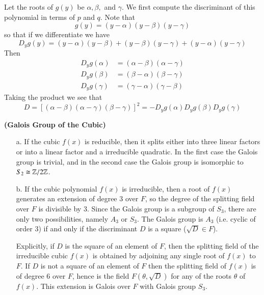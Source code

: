 Let the roots of $g(y)$ be $\alpha, \beta,$ and $\gamma$. We first compute the discriminant of this polynomial in terms of $p$ and $q$. Note that \begin{equation*}
    g(y) = (y-\alpha)(y-\beta)(y-\gamma)
\end{equation*}
so that if we differentiate we have \begin{equation*}
    D_yg(y) = (y-\alpha)(y-\beta) + (y-\beta)(y-\gamma) + (y-\alpha)(y-\gamma)
\end{equation*}
Then \begin{align*}
    D_yg(\alpha) &= (\alpha-\beta)(\alpha-\gamma) \\
    D_yg(\beta) &= (\beta-\alpha)(\beta -\gamma) \\
    D_yg(\gamma) &= (\gamma - \alpha)(\gamma - \beta)
\end{align*}
Taking the product we see that \begin{equation*}
    D = [(\alpha-\beta)(\alpha-\gamma)(\beta-\gamma)]^2 = -D_yg(\alpha)D_yg(\beta)D_yg(\gamma)
\end{equation*}


\textbf{(Galois Group of the Cubic)}

\begin{enumerate}
    \item[a.] If the cubic $f(x)$ is reducible, then it splits either into three linear factors or into a linear factor and a irreducible quadratic. In the first case the Galois group is trivial, and in the second case the Galois group is isomorphic to $S_2 \cong \mathbb Z/2\mathbb Z$.
    \item[b.] If the cubic polynomial $f(x)$ is irreducible, then a root of $f(x)$ generates an extension of degree $3$ over $F$, so the degree of the splitting field over $F$ is divisible by $3$. Since the Galois group is a subgroup of $S_3$, there are only two possibilities, namely $A_3$ or $S_3$. The Galois group is $A_3$ (i.e. cyclic of order $3$) if and only if the discriminant $D$ is a square ($\sqrt{D} \in F$).

        Explicitly, if $D$ is the square of an element of $F$, then the splitting field of the irreducible cubic $f(x)$ is obtained by adjoining any single root of $f(x)$ to $F$. If $D$ is not a square of an element of $F$ then the splitting field of $f(x)$ is of degree $6$ over $F$, hence is the field $F(\theta,\sqrt{D})$ for any of the roots $\theta$ of $f(x)$. This extension is Galois over $F$ with Galois group $S_3$.
\end{enumerate}



